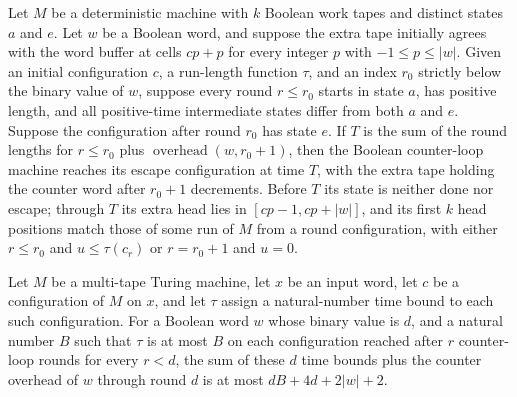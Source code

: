 \begin{theorem}
\label{Turing.counterLoopTM_run_escape}
\leanok
{}
Let $M$ be a deterministic machine with $k$ Boolean work tapes and distinct states $a$
and $e$. Let $w$ be a Boolean word, and suppose the extra tape initially agrees with the
word buffer at cells $cp+p$ for every integer $p$ with $-1\le p\le |w|$. Given an
initial configuration $c$, a run-length function $\tau$, and an index $r_0$ strictly
below the binary value of $w$, suppose every round $r\le r_0$ starts in state $a$, has
positive length, and all positive-time intermediate states differ from both $a$ and $e$.
Suppose the configuration after round $r_0$ has state $e$. If $T$ is the sum of the
round lengths for $r\le r_0$ plus $\operatorname{overhead}(w,r_0+1)$, then the Boolean
counter-loop machine reaches its escape configuration at time $T$, with the extra tape
holding the counter word after $r_0+1$ decrements. Before $T$ its state is neither done
nor escape; through $T$ its extra head lies in $[cp-1,cp+|w|]$, and its first $k$ head
positions match those of some run of $M$ from a round configuration, with either $r\le
r_0$ and $u\le\tau(c_r)$ or $r=r_0+1$ and $u=0$.
\end{theorem}

\begin{theorem}
\label{Turing.counterLoop_time_le}
\leanok
{}
Let $M$ be a multi-tape Turing machine, let $x$ be an input word, let $c$ be a
configuration of $M$ on $x$, and let $\tau$ assign a natural-number time bound to each
such configuration. For a Boolean word $w$ whose binary value is $d$, and a natural
number $B$ such that $\tau$ is at most $B$ on each configuration reached after $r$
counter-loop rounds for every $r<d$, the sum of these $d$ time bounds plus the counter
overhead of $w$ through round $d$ is at most $dB+4d+2|w|+2$.
\end{theorem}

